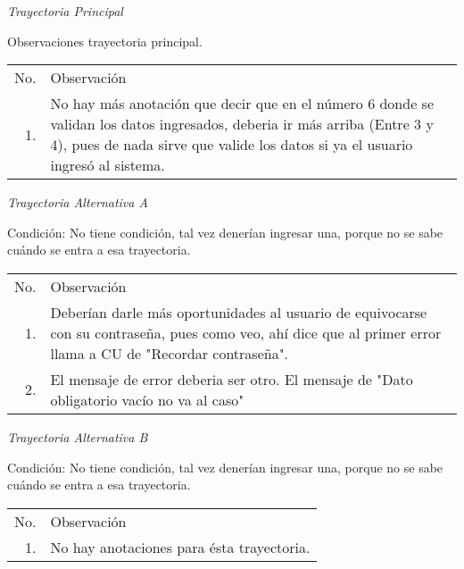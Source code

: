 \documentclass[10pt,spanish]{article}
\providecommand{\tabularnewline}{\\}
\begin{document}


\textit{\large Trayectoria Principal}{\large {} }{\large \par}

Observaciones trayectoria principal. 
\begin{longtable}{rp{8cm}}
No.  & Observación\tabularnewline
1.  & No hay más anotación que decir que en el número 6 donde se validan los datos
ingresados, deberia ir más arriba (Entre 3 y 4), pues de nada sirve que valide los datos
si ya el usuario ingresó al sistema.
\end{longtable}

\textit{Trayectoria Alternativa A}

Condición: No tiene condición, tal vez denerían ingresar una, porque no se sabe cuándo se entra a esa trayectoria.

\begin{longtable}{rp{8cm}}
No.  & Observación\tabularnewline
1.  & Deberían darle más oportunidades al usuario de equivocarse con su contraseña,
pues como veo, ahí dice que al primer error llama a CU de "Recordar contraseña".\tabularnewline
2.  & El mensaje de error deberia ser otro. El mensaje de "Dato obligatorio vacío no va al caso"\tabularnewline

\end{longtable}%

\textit{Trayectoria Alternativa B}

Condición: No tiene condición, tal vez denerían ingresar una, porque no se sabe cuándo se entra a esa trayectoria.

\begin{longtable}{rp{8cm}}
No.  & Observación\tabularnewline
1.  & No hay anotaciones para ésta trayectoria.\tabularnewline

\end{longtable}%
\newpage{} 
\end{document}
